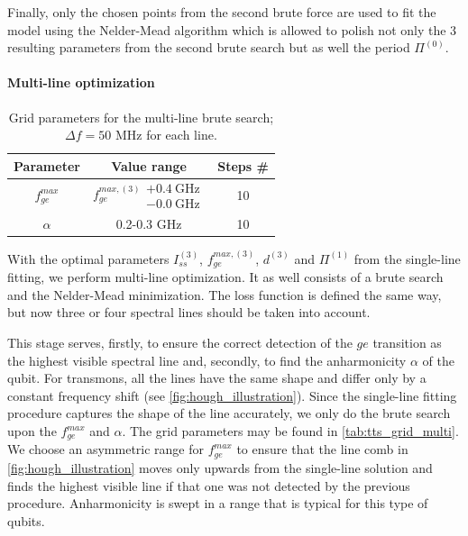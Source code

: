 \documentclass[%
 aip,
 amsmath,amssymb,
 reprint,%
]{revtex4-1}
\begin{document}
Finally, only the chosen points from the second brute force are used to fit the model using the Nelder-Mead algorithm which is allowed to polish not only the 3 resulting parameters from the second brute search but as well the period $\Pi^{(0)}$.

\paragraph{Multi-line optimization}

\begin{table}
	\centering
	\begin{ruledtabular}
		\begin{tabular}{ccc} 
			Parameter & Value range & Steps \# \\
			\hline
			$f_{ge}^{max}$ & $f_{ge}^{max, (3)}  \substack{+0.4\ \text{GHz} \\ -0.0\ \text{GHz}}$  & 10 \\
			$\alpha$ & 0.2-0.3 GHz & 10 
		\end{tabular} 
	\end{ruledtabular}
	\caption{Grid parameters for the multi-line brute search; $\Delta f = 50$ MHz for each line.}
	\label{tab:tts_grid_multi}
\end{table}

With the optimal parameters $I_{ss}^{(3)}$, $f_{ge}^{max, (3)}$, $d^{(3)}$ and $\Pi^{(1)}$ from the single-line fitting, we perform multi-line optimization. It as well consists of a brute search and the Nelder-Mead minimization. The loss function is defined the same way, but now three or four spectral lines should be taken into account.

This stage serves, firstly, to ensure the correct detection of the $ge$ transition as the highest visible spectral line and, secondly, to find the anharmonicity $\alpha$ of the qubit. For transmons, all the lines have the same shape and differ only by a constant frequency shift (see \autoref{fig:hough_illustration}). Since the single-line fitting procedure captures the shape of the line accurately, we only do the brute search upon the $f_{ge}^{max}$ and $\alpha$. The grid parameters may be found in \autoref{tab:tts_grid_multi}. We choose an asymmetric range for $f_{ge}^{max}$ to ensure that the line comb in \autoref{fig:hough_illustration} moves only upwards from the single-line solution and finds the highest visible line if that one was not detected by the previous procedure. Anharmonicity is swept in a range that is typical for this type of qubits.
\end{document}
